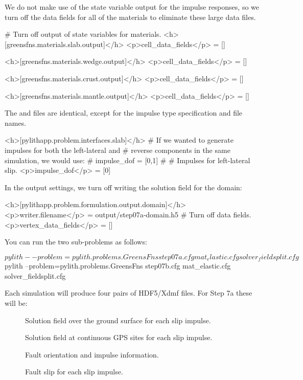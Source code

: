 We do not make use of the state variable output for the impulse
responses, so we turn off the data fields for all of the
materials to eliminate these large data files.
\begin{cfg}
# Turn off output of state variables for materials.
<h>[greensfns.materials.slab.output]</h>
<p>cell_data_fields</p> = []

<h>[greensfns.materials.wedge.output]</h>
<p>cell_data_fields</p> = []

<h>[greensfns.materials.crust.output]</h>
<p>cell_data_fields</p> = []

<h>[greensfns.materials.mantle.output]</h>
<p>cell_data_fields</p> = []
\end{cfg}

The  and  files are
identical, except for the impulse type specification and file
names.
\begin{cfg}
<h>[pylithapp.problem.interfaces.slab]</h>
# If we wanted to generate impulses for both the left-lateral and
# reverse components in the same simulation, we would use:
# impulse_dof = [0,1]
#
# Impulses for left-lateral slip.
<p>impulse_dof</p> = [0]
\end{cfg}

In the output settings, we turn off writing the solution field for the
domain:
\begin{cfg}
<h>[pylithapp.problem.formulation.output.domain]</h>
<p>writer.filename</p> = output/step07a-domain.h5
# Turn off data fields.
<p>vertex_data_fields</p> = []
\end{cfg}

You can run the two sub-problems as follows:
\begin{shell}
$$ pylith --problem=pylith.problems.GreensFns step07a.cfg mat_elastic.cfg solver_fieldsplit.cfg
$$ pylith --problem=pylith.problems.GreensFns step07b.cfg mat_elastic.cfg solver_fieldsplit.cfg
\end{shell}
Each simulation will produce four pairs of HDF5/Xdmf files. For Step
7a these will be:
\begin{description}
\item[] Solution field over the
  ground surface for each slip impulse.
\item[] Solution field at
  continuous GPS sites for each slip impulse.
\item[] Fault orientation
  and impulse information.
\item[] Fault slip for each slip
  impulse.
\end{description}

